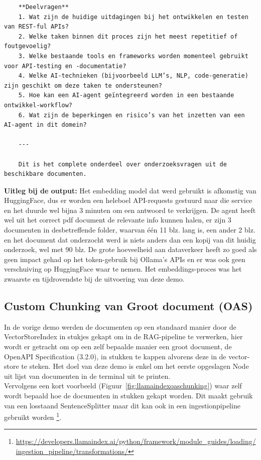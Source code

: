\begin{verbatim}
    **Deelvragen**
    1. Wat zijn de huidige uitdagingen bij het ontwikkelen en testen van REST‑ful APIs?
    2. Welke taken binnen dit proces zijn het meest repetitief of foutgevoelig?
    3. Welke bestaande tools en frameworks worden momenteel gebruikt voor API‑testing en -documentatie?
    4. Welke AI‑technieken (bijvoorbeeld LLM’s, NLP, code‑generatie) zijn geschikt om deze taken te ondersteunen?
    5. Hoe kan een AI‑agent geïntegreerd worden in een bestaande ontwikkel‑workflow?
    6. Wat zijn de beperkingen en risico’s van het inzetten van een AI‑agent in dit domein?
    
    ---
    
    Dit is het complete onderdeel over onderzoeksvragen uit de beschikbare documenten.
\end{verbatim}

\textbf{Uitleg bij de output:} Het embedding model dat werd gebruikt is afkomstig van HuggingFace, dus er worden een heleboel API-requests gestuurd naar die service en het duurde wel bijna 3 minuten om een antwoord te verkrijgen. De agent heeft wel uit het correct pdf document de relevante info kunnen halen, er zijn 3 documenten in desbetreffende folder, waarvan één 11 blz. lang is, een ander 2 blz. en het document dat onderzocht werd is niets anders dan een kopij van dit huidig onderzoek, wel met 90 blz. De grote hoeveelheid aan dataverkeer heeft zo goed als geen impact gehad op het token-gebruik bij Ollama's APIs en er was ook geen verschuiving op HuggingFace waar te nemen. Het embeddings-proces was het zwaarste en tijdrovendste bij de uitvoering van deze demo.

\subsection{Custom Chunking van Groot document (OAS)}
\label{ssec:customchunkingvangrootdocumentoas}
In de vorige demo werden de documenten op een standaard manier door de VectorStoreIndex in stukjes gekapt om in de RAG-pipeline te verwerken, hier wordt er getracht om op een zelf bepaalde manier een groot document, de OpenAPI Specification (3.2.0), in stukken te kappen alvorens deze in de vector-store te steken. Het doel van deze demo is enkel om het eerste opgeslagen Node uit lijst van documenten in de terminal uit te printen. \\

Vervolgens een kort voorbeeld (Figuur~\ref{fig:llamaindexoaschunking}) waar zelf wordt bepaald hoe de documenten in stukken gekapt worden. Dit maakt gebruik van een losstaand SentenceSplitter maar dit kan ook in een ingestionpipeline gebruikt worden \footnote{\href{https://developers.llamaindex.ai/python/framework/module_guides/loading/ingestion_pipeline/transformations/}{https://developers.llamaindex.ai/python/framework/module\_guides/loading/ingestion\_pipeline/transformations/}}.


